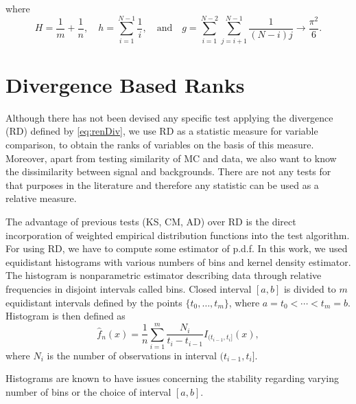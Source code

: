 where
\begin{equation}
H = \frac{1}{m}+\frac{1}{n},\quad	h = \sum_{i=1}^{N-1}\frac{1}{i},\quad \mathrm{ and } \quad g = \sum_{i=1}^{N-2}\sum_{j=i+1}^{N-1}\frac{1}{(N-i)j}\rightarrow \frac{\pi^2}{6}.
\end{equation}

\section{\ren Divergence Based Ranks}
Although there has not been devised any specific test applying the \ren divergence (RD)  defined by \eqref{eq:renDiv}, we use RD as a statistic measure for variable comparison, to obtain the ranks of variables on the basis of this measure. %
Moreover, apart from testing similarity of MC and data, we also want to know the dissimilarity between signal and backgrounds. There are not any tests for that purposes in the literature and therefore any statistic can be used as a relative measure. 

The advantage of previous tests (KS, CM, AD) over RD is the direct incorporation of weighted empirical distribution functions into the test algorithm. For using RD, we have to compute some estimator of p.d.f. In this work, we used equidistant histograms with various numbers of bins and kernel density estimator. The histogram is nonparametric estimator describing data through relative frequencies in disjoint intervals called bins. Closed interval $[a,b]$ is divided to $m$ equidistant intervals defined by the points $\lbrace t_0, \ldots, t_m \rbrace$, where $a = t_0 < \cdots < t_m = b.$ Histogram is then defined as 
\begin{equation}
\hat{f}_n(x) = \frac{1}{n} \sum_{i=1}^m \frac{N_i}{t_i - t_{i-1}} I_{(t_{i-1}, t_i]}(x),
\end{equation}
where $N_i$ is the number of observations in interval $(t_{i-1}, t_i]$. 

Histograms are known to have issues concerning the stability regarding varying number of bins or the choice of interval $[a,b]$.

